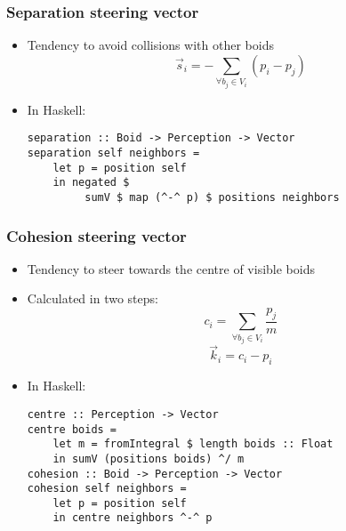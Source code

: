 \documentclass{beamer}
\begin{document}
\begin{frame}[fragile]
    \frametitle{\huge{Separation steering vector}\normalsize}
    \begin{itemize}

    \item Tendency to avoid collisions with other boids
        \begin{equation*}
    \vec{s}_i = - \sum\limits_{\forall b_j \in V_i} (p_i - p_j)
    \end{equation*}
    \item In Haskell:
    \begin{verbatim}
separation :: Boid -> Perception -> Vector
separation self neighbors =
    let p = position self
    in negated $
         sumV $ map (^-^ p) $ positions neighbors
\end{verbatim}
    \end{itemize}


\end{frame}

\begin{frame}[fragile]
\frametitle{\huge{Cohesion steering vector}\normalsize}
    \begin{itemize}
        \item Tendency to steer towards the centre of visible boids
        \item Calculated in two steps:
                \begin{equation}
        c_i = \sum\limits_{\forall b_j \in V_i} \frac{p_j}{m}
        \end{equation}
        \begin{equation}
        \vec{k}_i = c_i - p_i
        \end{equation}
        \item In Haskell:
        \begin{verbatim}
centre :: Perception -> Vector
centre boids =
    let m = fromIntegral $ length boids :: Float
    in sumV (positions boids) ^/ m
cohesion :: Boid -> Perception -> Vector
cohesion self neighbors =
    let p = position self
    in centre neighbors ^-^ p
        \end{verbatim}

    \end{itemize}


\end{frame}
\end{document}
